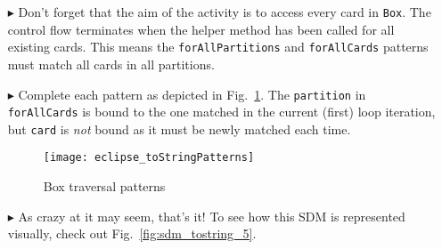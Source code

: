 \begin{itemize}
\item[$\blacktriangleright$] Don't forget that the aim of the activity is to access every card in \texttt{Box}. The control flow terminates when the helper
method has been called for all existing cards. This means the \texttt{forAllPartitions} and \texttt{forAllCards} patterns must match all cards in all
partitions.

\clearpage

\item[$\blacktriangleright$] Complete each pattern as depicted in Fig.~\ref{fig:toStringPatterns}. The \texttt{partition} in \texttt{forAllCards} is bound to
the one matched in the current (first) loop iteration, but \texttt{card} is \emph{not} bound as it must be newly matched each time.

\vspace{0.5cm}

\begin{figure}[htp]
\begin{center}
  \texttt{[image: eclipse\_toStringPatterns]}
  \caption{Box traversal patterns}
  \label{fig:toStringPatterns}
\end{center}
\end{figure}

\vspace{0.5cm}

\item[$\blacktriangleright$] As crazy at it may seem, that's it!  To see how this SDM is represented visually, check out Fig.~\ref{fig:sdm_tostring_5}.

\end{itemize}
